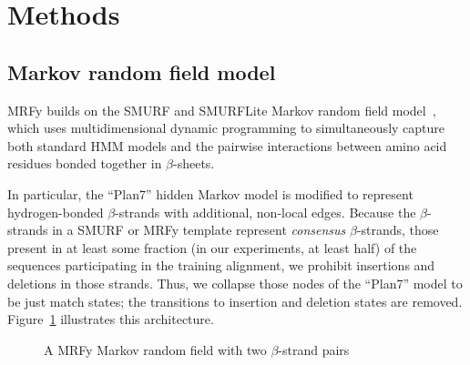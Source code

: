 \documentclass[blockstyle,times,preprint]{sigplanconf}
\begin{document}
\section{Methods}

\subsection{Markov random field model}

MRFy builds on the SMURF and SMURFLite Markov random field 
model~\cite{Daniels:2012dg}, which uses multidimensional 
dynamic programming to simultaneously capture both standard HMM models and the
pairwise interactions between amino acid residues bonded together in
$\beta$-sheets. 

In particular, the ``Plan7'' hidden Markov model is modified to represent
hydrogen-bonded $\beta$-strands with additional, non-local edges.
Because the $\beta$-strands in a SMURF or MRFy template represent 
\emph{consensus} 
$\beta$-strands, those present in at least some fraction (in our experiments, 
at least
half) of the sequences participating in the training alignment, we prohibit
insertions and deletions in those strands.
Thus, we collapse those nodes of the ``Plan7'' model to be just match states;
the transitions to insertion and deletion states are removed.
Figure~\ref{mrfy_model} illustrates this architecture.


\begin{figure}[htb!]
\begin{center}
   \caption{A MRFy Markov random field with two $\beta$-strand pairs}
   \label{mrfy_model}
 \end{center}
\end{figure}
\end{document}
